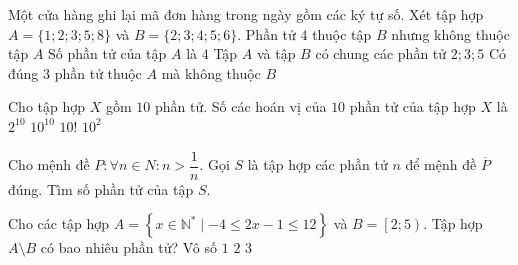 \begin{ex}%
	Một cửa hàng ghi lại mã đơn hàng trong ngày gồm các ký tự số. Xét tập hợp $A=\{1;2;3;5;8\}$ và $B=\{2;3;4;5;6\}$.
	\choiceTF
		{\True Phần tử $4$ thuộc tập $B$ nhưng không thuộc tập $A$}
		{Số phần tử của tập $A$ là $4$}
		{\True Tập $A$ và tập $B$ có chung các phần tử $2;3;5$}
		{\True Có đúng $3$ phần tử thuộc $A$ mà không thuộc $B$}
\end{ex}

\begin{ex}%
	Cho tập hợp $X$ gồm $10$ phần tử. Số các hoán vị  của $10$ phần tử của tập hợp $X$ là
	\choice 
		 {$2^{10}$}
		 {$10^{10}$}
		{\True$10!$} 
		 {$10^2$}
\end{ex}

\begin{bt}%
	Cho mệnh đề  $P: \forall n\in N: n > \dfrac{1}{n}$. Gọi $S$ là tập hợp các phần tử $n$ để mệnh đề $\overline{P}$ đúng. Tìm số phần tử của tập $S$.
\end{bt}

\begin{ex}%
	Cho  các tập hợp $A=\left\{x\in \mathbb{N^*}\mid -4\le 2x-1\le 12\right\}$ và $B=\left[2;5\right)$. Tập hợp $A\setminus B$ có bao nhiêu phần tử?
	\choice 
		{Vô  số}
		{$1$} 
		 {$2$}
		 {\True $3$}
\end{ex}

